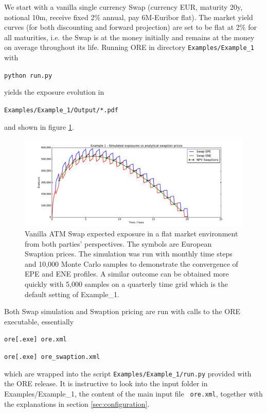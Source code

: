 \documentclass[12pt, a4paper]{article}
\begin{document}
We start with a vanilla single currency Swap (currency EUR, maturity 20y, notional 10m, receive fixed 2\% annual, pay
6M-Euribor flat). The market yield curves (for both discounting and forward projection) are set to be flat at 2\% for
all maturities, i.e. the Swap is at the money initially and remains at the money on average throughout its life. Running
ORE in directory {\tt Examples/Example\_1} with

\medskip
\centerline{\tt python run.py } 
\medskip

yields the exposure evolution in 

\medskip
\centerline{\tt Examples/Example\_1/Output/*.pdf } 
\medskip

and shown in figure \ref{fig_1}. 
\begin{figure}[h!]
\begin{center}
\includegraphics[scale=0.45]{mpl_swap_1_1m_sbb_10k_flat.pdf}
\end{center}
\caption{Vanilla ATM Swap expected exposure in a flat market environment from both parties' perspectives. The symbols are European Swaption prices. The simulation was run with monthly time steps and 10,000 Monte Carlo samples to demonstrate the convergence of EPE and ENE profiles. A similar
outcome can be obtained more quickly with 5,000 samples on a quarterly time grid which is the default setting of Example\_1. }
\label{fig_1}
\end{figure}
Both Swap simulation and Swaption pricing are run with calls to the ORE executable, essentially 

\medskip
\centerline{\tt ore[.exe] ore.xml} 

\centerline{\tt ore[.exe] ore\_swaption.xml} 
\medskip

which are wrapped into the script {\tt Examples/Example\_1/run.py} provided with the ORE release.
It is instructive to look into the input folder in Examples/Example\_1, the content of the main input file {\tt
  ore.xml}, together with the explanations in section \ref{sec:configuration}. \\
\end{document}
